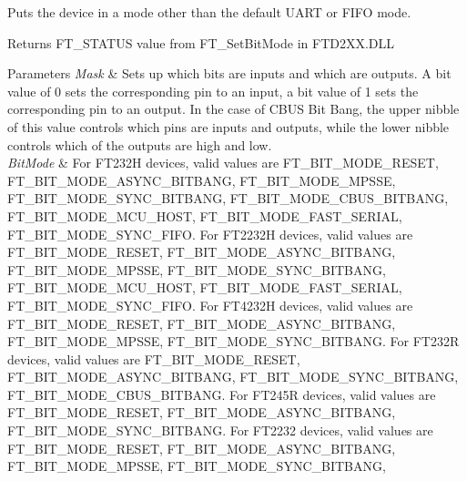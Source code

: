 Puts the device in a mode other than the default U\+A\+RT or F\+I\+FO mode. 

\begin{DoxyReturn}{Returns}
F\+T\+\_\+\+S\+T\+A\+T\+US value from F\+T\+\_\+\+Set\+Bit\+Mode in F\+T\+D2\+X\+X.\+D\+LL
\end{DoxyReturn}

\begin{DoxyParams}{Parameters}
{\em Mask} & Sets up which bits are inputs and which are outputs. A bit value of 0 sets the corresponding pin to an input, a bit value of 1 sets the corresponding pin to an output. In the case of C\+B\+US Bit Bang, the upper nibble of this value controls which pins are inputs and outputs, while the lower nibble controls which of the outputs are high and low.\\
\hline
{\em Bit\+Mode} & For F\+T232H devices, valid values are F\+T\+\_\+\+B\+I\+T\+\_\+\+M\+O\+D\+E\+\_\+\+R\+E\+S\+ET, F\+T\+\_\+\+B\+I\+T\+\_\+\+M\+O\+D\+E\+\_\+\+A\+S\+Y\+N\+C\+\_\+\+B\+I\+T\+B\+A\+NG, F\+T\+\_\+\+B\+I\+T\+\_\+\+M\+O\+D\+E\+\_\+\+M\+P\+S\+SE, F\+T\+\_\+\+B\+I\+T\+\_\+\+M\+O\+D\+E\+\_\+\+S\+Y\+N\+C\+\_\+\+B\+I\+T\+B\+A\+NG, F\+T\+\_\+\+B\+I\+T\+\_\+\+M\+O\+D\+E\+\_\+\+C\+B\+U\+S\+\_\+\+B\+I\+T\+B\+A\+NG, F\+T\+\_\+\+B\+I\+T\+\_\+\+M\+O\+D\+E\+\_\+\+M\+C\+U\+\_\+\+H\+O\+ST, F\+T\+\_\+\+B\+I\+T\+\_\+\+M\+O\+D\+E\+\_\+\+F\+A\+S\+T\+\_\+\+S\+E\+R\+I\+AL, F\+T\+\_\+\+B\+I\+T\+\_\+\+M\+O\+D\+E\+\_\+\+S\+Y\+N\+C\+\_\+\+F\+I\+FO. For F\+T2232H devices, valid values are F\+T\+\_\+\+B\+I\+T\+\_\+\+M\+O\+D\+E\+\_\+\+R\+E\+S\+ET, F\+T\+\_\+\+B\+I\+T\+\_\+\+M\+O\+D\+E\+\_\+\+A\+S\+Y\+N\+C\+\_\+\+B\+I\+T\+B\+A\+NG, F\+T\+\_\+\+B\+I\+T\+\_\+\+M\+O\+D\+E\+\_\+\+M\+P\+S\+SE, F\+T\+\_\+\+B\+I\+T\+\_\+\+M\+O\+D\+E\+\_\+\+S\+Y\+N\+C\+\_\+\+B\+I\+T\+B\+A\+NG, F\+T\+\_\+\+B\+I\+T\+\_\+\+M\+O\+D\+E\+\_\+\+M\+C\+U\+\_\+\+H\+O\+ST, F\+T\+\_\+\+B\+I\+T\+\_\+\+M\+O\+D\+E\+\_\+\+F\+A\+S\+T\+\_\+\+S\+E\+R\+I\+AL, F\+T\+\_\+\+B\+I\+T\+\_\+\+M\+O\+D\+E\+\_\+\+S\+Y\+N\+C\+\_\+\+F\+I\+FO. For F\+T4232H devices, valid values are F\+T\+\_\+\+B\+I\+T\+\_\+\+M\+O\+D\+E\+\_\+\+R\+E\+S\+ET, F\+T\+\_\+\+B\+I\+T\+\_\+\+M\+O\+D\+E\+\_\+\+A\+S\+Y\+N\+C\+\_\+\+B\+I\+T\+B\+A\+NG, F\+T\+\_\+\+B\+I\+T\+\_\+\+M\+O\+D\+E\+\_\+\+M\+P\+S\+SE, F\+T\+\_\+\+B\+I\+T\+\_\+\+M\+O\+D\+E\+\_\+\+S\+Y\+N\+C\+\_\+\+B\+I\+T\+B\+A\+NG. For F\+T232R devices, valid values are F\+T\+\_\+\+B\+I\+T\+\_\+\+M\+O\+D\+E\+\_\+\+R\+E\+S\+ET, F\+T\+\_\+\+B\+I\+T\+\_\+\+M\+O\+D\+E\+\_\+\+A\+S\+Y\+N\+C\+\_\+\+B\+I\+T\+B\+A\+NG, F\+T\+\_\+\+B\+I\+T\+\_\+\+M\+O\+D\+E\+\_\+\+S\+Y\+N\+C\+\_\+\+B\+I\+T\+B\+A\+NG, F\+T\+\_\+\+B\+I\+T\+\_\+\+M\+O\+D\+E\+\_\+\+C\+B\+U\+S\+\_\+\+B\+I\+T\+B\+A\+NG. For F\+T245R devices, valid values are F\+T\+\_\+\+B\+I\+T\+\_\+\+M\+O\+D\+E\+\_\+\+R\+E\+S\+ET, F\+T\+\_\+\+B\+I\+T\+\_\+\+M\+O\+D\+E\+\_\+\+A\+S\+Y\+N\+C\+\_\+\+B\+I\+T\+B\+A\+NG, F\+T\+\_\+\+B\+I\+T\+\_\+\+M\+O\+D\+E\+\_\+\+S\+Y\+N\+C\+\_\+\+B\+I\+T\+B\+A\+NG. For F\+T2232 devices, valid values are F\+T\+\_\+\+B\+I\+T\+\_\+\+M\+O\+D\+E\+\_\+\+R\+E\+S\+ET, F\+T\+\_\+\+B\+I\+T\+\_\+\+M\+O\+D\+E\+\_\+\+A\+S\+Y\+N\+C\+\_\+\+B\+I\+T\+B\+A\+NG, F\+T\+\_\+\+B\+I\+T\+\_\+\+M\+O\+D\+E\+\_\+\+M\+P\+S\+SE, F\+T\+\_\+\+B\+I\+T\+\_\+\+M\+O\+D\+E\+\_\+\+S\+Y\+N\+C\+\_\+\+B\+I\+T\+B\+A\+NG, 
\end{DoxyParams}
